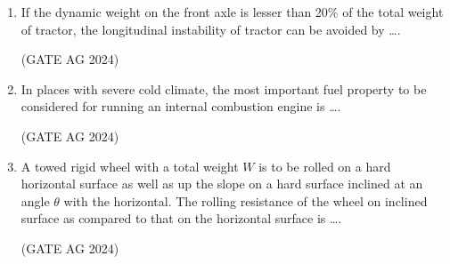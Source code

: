 \documentclass[journal]{IEEEtran}
\begin{document}
\begin{enumerate}
 \medskip


\item
If the dynamic weight on the front axle is lesser than 20\% of the total weight of tractor, the longitudinal instability of tractor can be avoided by \dots.
    \begin{enumerate}
    \end{enumerate}
     \hfill(GATE AG 2024)\\

     \medskip

\item
In places with severe cold climate, the most important fuel property to be considered for running an internal combustion engine is \dots.
    \begin{enumerate}
    \end{enumerate}
     \hfill(GATE AG 2024)\\

     \medskip


\item
A towed rigid wheel with a total weight $W$ is to be rolled on a hard horizontal surface as well as up the slope on a hard surface inclined at an angle $\theta$ with the horizontal. The rolling resistance of the wheel on inclined surface as compared to that on the horizontal surface is \dots.

\begin{enumerate}
\end{enumerate}
 \hfill(GATE AG 2024)\\


\end{enumerate}
\end{document}
